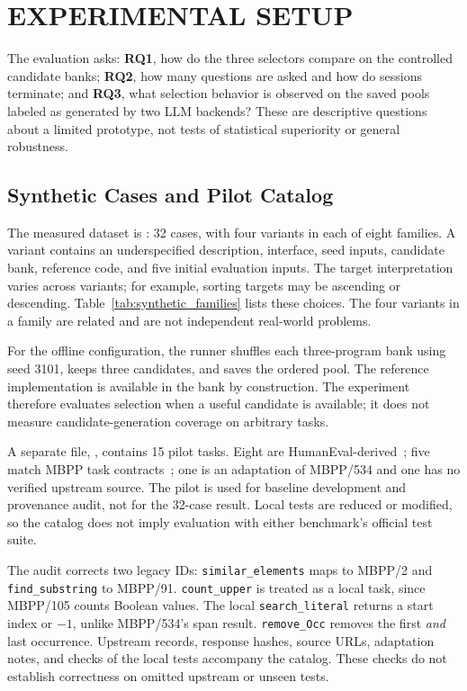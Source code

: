 \section{EXPERIMENTAL SETUP}\label{sec:setup}
The evaluation asks: \textbf{RQ1}, how do the three selectors compare on the controlled candidate banks; \textbf{RQ2}, how many questions are asked and how do sessions terminate; and \textbf{RQ3}, what selection behavior is observed on the saved pools labeled as generated by two LLM backends? These are descriptive questions about a limited prototype, not tests of statistical superiority or general robustness.

\subsection{Synthetic Cases and Pilot Catalog}
The measured dataset is : 32 cases, with four variants in each of eight families. A variant contains an underspecified description, interface, seed inputs, candidate bank, reference code, and five initial evaluation inputs. The target interpretation varies across variants; for example, sorting targets may be ascending or descending. Table~\ref{tab:synthetic_families} lists these choices. The four variants in a family are related and are not independent real-world problems.


For the offline configuration, the runner shuffles each three-program bank using seed 3101, keeps three candidates, and saves the ordered pool. The reference implementation is available in the bank by construction. The experiment therefore evaluates selection when a useful candidate is available; it does not measure candidate-generation coverage on arbitrary tasks.

A separate file, , contains 15 pilot tasks. Eight are HumanEval-derived~\cite{humaneval}; five match MBPP task contracts~\cite{mbpp}; one is an adaptation of MBPP/534 and one has no verified upstream source. The pilot is used for baseline development and provenance audit, not for the 32-case result. Local tests are reduced or modified, so the catalog does not imply evaluation with either benchmark's official test suite.


The audit corrects two legacy IDs: \texttt{similar\_elements} maps to MBPP/2 and \texttt{find\_substring} to MBPP/91. \texttt{count\_upper} is treated as a local task, since MBPP/105 counts Boolean values. The local \texttt{search\_literal} returns a start index or $-1$, unlike MBPP/534's span result. \texttt{remove\_Occ} removes the first \emph{and} last occurrence. Upstream records, response hashes, source URLs, adaptation notes, and checks of the local tests accompany the catalog. These checks do not establish correctness on omitted upstream or unseen tests.

